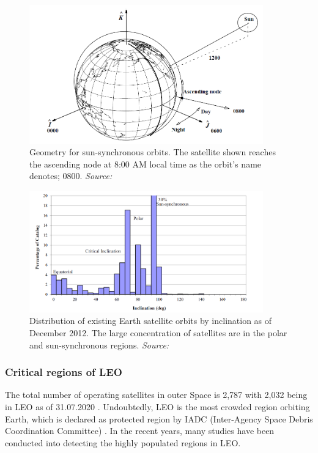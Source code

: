 \begin{figure}
\centering
\includegraphics[width=0.9\textwidth]{Images/sso.png}\caption{Geometry for sun-synchronous orbits. The satellite shown reaches the ascending node at 8:00 AM local time as the orbit's name denotes; 0800. \textit{Source: \cite{Vallado}}}
\label{sso} 
\end{figure}

\begin{figure}
\centering
\includegraphics[width=0.9\textwidth]{Images/inclination-satellites.png}\caption{Distribution of existing Earth satellite orbits by inclination as of December 2012. The large concentration of satellites are in the polar and sun-synchronous regions. \textit{Source: \cite{Vallado}}}
\label{inclination-satellites} 
\end{figure}

\bigskip
\subsubsection{Critical regions of LEO}
\bigskip

The total number of operating satellites in outer Space is 2,787 with 2,032 being in LEO as of 31.07.2020 \cite{UCS}. Undoubtedly, LEO is the most crowded region orbiting Earth, which is declared as protected region by IADC (Inter-Agency Space Debris Coordination Committee) \cite{IADC 2007}. In the recent years, many studies have been conducted into detecting the highly populated regions in LEO.

